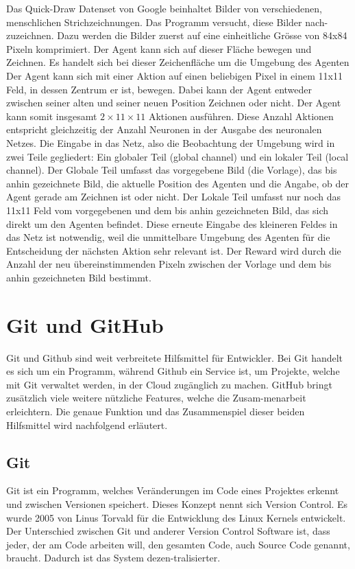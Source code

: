 Das Quick-Draw Datenset von Google beinhaltet Bilder von verschiedenen,
menschlichen Strichzeichnungen. Das Programm versucht, diese Bilder
nach\hyp{}zuzeichnen. Dazu werden die Bilder zuerst auf eine einheitliche Grösse von
84x84 Pixeln komprimiert. Der Agent kann sich auf dieser Fläche bewegen und
Zeichnen. Es handelt sich bei dieser Zeichenfläche um die Umgebung des Agenten
Der Agent kann sich mit einer Aktion auf einen beliebigen Pixel in einem 11x11
Feld, in dessen Zentrum er ist, bewegen. Dabei kann der Agent entweder zwischen
seiner alten und seiner neuen Position Zeichnen oder nicht. Der Agent kann somit
insgesamt $2\times11\times11$ Aktionen ausführen. Diese Anzahl Aktionen entspricht
gleichzeitig der Anzahl Neuronen in der Ausgabe des neuronalen Netzes. Die
Eingabe in das Netz, also die Beobachtung der Umgebung wird in zwei Teile
gegliedert: Ein globaler Teil (global channel) und ein lokaler Teil (local
channel). Der Globale Teil umfasst das vorgegebene Bild (die Vorlage), das bis
anhin gezeichnete Bild, die aktuelle Position des Agenten und die Angabe, ob der
Agent gerade am Zeichnen ist oder nicht. Der Lokale Teil umfasst nur noch das
11x11 Feld vom vorgegebenen und dem bis anhin gezeichneten Bild, das sich direkt
um den Agenten befindet. Diese erneute Eingabe des kleineren Feldes in das Netz
ist notwendig, weil die unmittelbare Umgebung des Agenten für die Entscheidung
der nächsten Aktion sehr relevant ist. Der Reward wird durch die Anzahl der neu
übereinstimmenden Pixeln zwischen der Vorlage und dem bis anhin
gezeichneten Bild bestimmt. 

\section{Git und GitHub}
\label{chap:git_github}
Git und Github sind weit verbreitete Hilfsmittel für Entwickler. Bei Git handelt
es sich um ein Programm, während Github ein Service ist, um Projekte, welche mit
Git verwaltet werden, in der Cloud zugänglich zu machen. GitHub bringt zusätzlich
viele weitere nützliche Features, welche die Zusam\hyp{}menarbeit erleichtern. Die
genaue Funktion und das Zusammenspiel dieser beiden Hilfsmittel wird nachfolgend
erläutert.

\subsection*{Git}
Git ist ein Programm, welches Veränderungen im Code eines Projektes erkennt und
zwischen Versionen speichert. Dieses Konzept nennt sich Version Control. Es
wurde 2005 von Linus Torvald für die Entwicklung des Linux Kernels entwickelt.
Der Unterschied zwischen Git und anderer Version Control Software ist, dass
jeder, der am Code arbeiten will, den gesamten Code, auch Source Code genannt,
braucht. Dadurch ist das System dezen\hyp{}tralisierter.
\cite{noauthor_git_2021}

